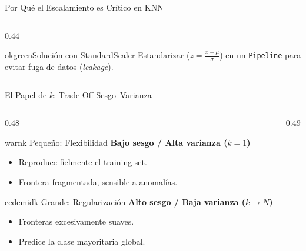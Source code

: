 \begin{frame}{Por Qué el Escalamiento es Crítico en KNN}
\begin{columns}[T,onlytextwidth]
\begin{column}{0.44\textwidth}
\vspace{0.08cm}
\begin{contrastbox}{okgreen}{Solución con StandardScaler}
Estandarizar ($z = \frac{x - \mu}{\sigma}$) en un \texttt{Pipeline} para evitar fuga de datos (\textit{leakage}).
\end{contrastbox}
\end{column}
\end{columns}
\end{frame}

\begin{frame}{El Papel de $k$: Trade-Off Sesgo--Varianza}
\begin{columns}[T,onlytextwidth]
\begin{column}{0.48\textwidth}
\begin{contrastbox}{warn}{k Pequeño: Flexibilidad}
\scriptsize
\textbf{Bajo sesgo / Alta varianza ($k=1$)}
\begin{itemize}\setlength{\itemsep}{0.10em}
  \item Reproduce fielmente el training set.
  \item Frontera fragmentada, sensible a anomalías.
\end{itemize}
\end{contrastbox}

\vspace{0.08cm}
\begin{contrastbox}{ccdemid}{k Grande: Regularización}
\scriptsize
\textbf{Alto sesgo / Baja varianza ($k \to N$)}
\begin{itemize}\setlength{\itemsep}{0.10em}
  \item Fronteras excesivamente suaves.
  \item Predice la clase mayoritaria global.
\end{itemize}
\end{contrastbox}
\end{column}

\begin{column}{0.49\textwidth}
\centering
{}
\end{column}
\end{columns}
\end{frame}
